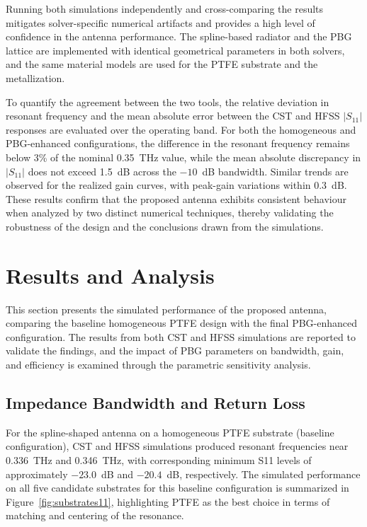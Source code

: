 \documentclass[USenglish]{article}
\begin{document}
Running both simulations independently and cross-comparing the results mitigates solver-specific numerical artifacts and provides a high level of confidence in the antenna performance. The spline-based radiator and the PBG lattice are implemented with identical geometrical parameters in both solvers, and the same material models are used for the PTFE substrate and the metallization.

To quantify the agreement between the two tools, the relative deviation in resonant frequency and the mean absolute error between the CST and HFSS $\lvert S_{11} \rvert$ responses are evaluated over the operating band. For both the homogeneous and PBG-enhanced configurations, the difference in the resonant frequency remains below 3\% of the nominal 0.35~THz value, while the mean absolute discrepancy in $\lvert S_{11} \rvert$ does not exceed 1.5~dB across the \(-10\)~dB bandwidth. Similar trends are observed for the realized gain curves, with peak-gain variations within 0.3~dB. These results confirm that the proposed antenna exhibits consistent behaviour when analyzed by two distinct numerical techniques, thereby validating the robustness of the design and the conclusions drawn from the simulations.



\section{Results and Analysis}
\label{sec:results}

This section presents the simulated performance of the proposed antenna, comparing the baseline homogeneous PTFE design with the final PBG-enhanced configuration. The results from both CST and HFSS simulations are reported to validate the findings, and the impact of PBG parameters on bandwidth, gain, and efficiency is examined through the parametric sensitivity analysis.

\subsection{Impedance Bandwidth and Return Loss}
\label{subsec:s11_bw}

For the spline-shaped antenna on a homogeneous PTFE substrate (baseline configuration), CST and HFSS simulations produced resonant frequencies near 0.336~THz and 0.346~THz, with corresponding minimum S11 levels of approximately $-23.0$~dB and $-20.4$~dB, respectively. The simulated performance on all five candidate substrates for this baseline configuration is summarized in Figure~\ref{fig:substrates11}, highlighting PTFE as the best choice in terms of matching and centering of the resonance.
\end{document}
